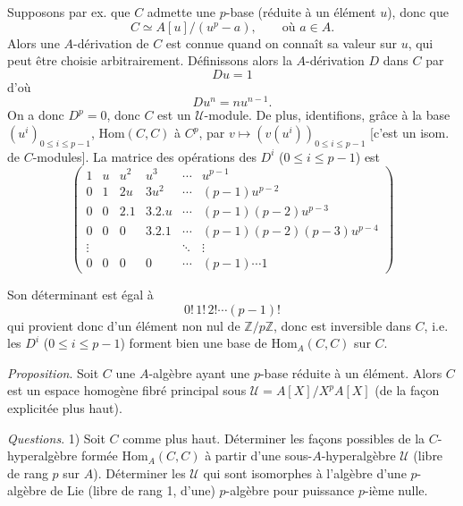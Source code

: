\documentclass[11pt,a4paper]{article}
\begin{document}
 Supposons par ex. que $C$ admette une $p$-base
 (réduite à un élément $u$), donc que
\[
C \simeq A[u]/(u^p - a), \qquad \text{où } a \in A .
\]
  Alors une $A$-dérivation de $C$ est connue
quand on connaît sa valeur sur $u$, qui peut être choisie arbitrairement.
Définissons alors la $A$-dérivation $D$ dans $C$ par
\[
Du = 1
\]
d'où
\[
Du^n = n u^{n-1} .
\]
On a donc $D^p = 0$, donc $C$ est un $\mathcal{U}$-module. De plus,
 identifions, grâce à la base
$(u^i)_{0 \leq i \leq p-1}$, $\mathrm{Hom}(C, C)$ à $C^p$, par
$v \mapsto (v(u^i))_{0 \leq i \leq p-1}$ [c'est un isom. de $C$-modules].
 La matrice des opérations des $D^i$
($0 \leq i \leq p-1$) est
\[
\begin{pmatrix}
1 & u & u^2 & u^3 & \cdots & u^{p-1} \\
0 & 1 & 2u & 3u^2 & \cdots & (p-1) u^{p-2} \\
0 & 0 & 2.1 & 3.2.u & \cdots & (p-1)(p-2) u^{p-3} \\
0 & 0 & 0 & 3.2.1 & \cdots & (p-1)(p-2)(p-3) u^{p-4} \\
\vdots & & & & \ddots & \vdots \\
0 & 0 & 0 & 0 & \cdots & (p-1) \cdots 1
\end{pmatrix}
\]


Son déterminant est égal à
\[
0!\, 1!\, 2! \cdots (p-1)!
\]
qui provient donc d'un élément non nul de $\mathbb{Z}/p\mathbb{Z}$, donc
est inversible dans $C$, i.e. les $D^i$ ($0 \leq i \leq p-1$) forment bien
une base de $\mathrm{Hom}_A(C, C)$ sur $C$. 

\emph{Proposition}. Soit $C$ une $A$-algèbre ayant une $p$-base réduite à
un élément. Alors $C$ est un espace homogène fibré principal sous
$\mathcal{U} = A[X]/X^p A[X]$ (de la façon explicitée plus
haut).

\emph{Questions}. 1) Soit $C$ comme plus haut. Déterminer les façons
possibles de \struck{\ill{} \ill{}}   la
$C$-hyperalgèbre  formée $\mathrm{Hom}_A(C, C)$ à partir d'une
sous-$A$-hyperalgèbre $\mathcal{U}$ (libre de rang $p$ sur $A$).
Déterminer les $\mathcal{U}$  qui sont isomorphes à
l'algèbre  
\ill{} d'une $p$-algèbre de Lie  (libre de rang 1,
d'une) $p$-algèbre pour  puissance $p$-ième
nulle.
\end{document}
